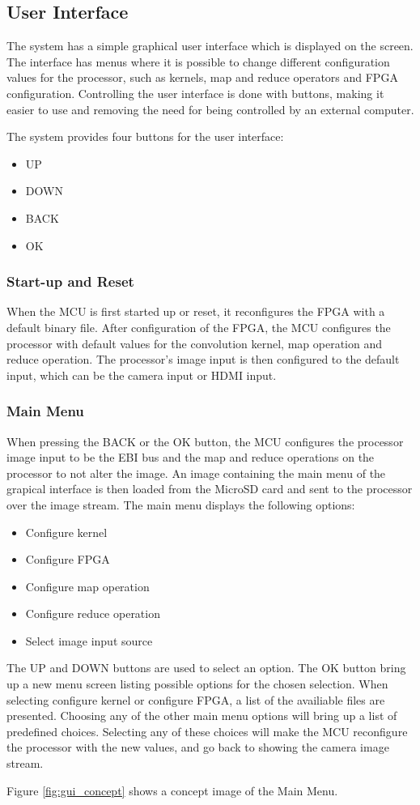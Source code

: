 \subsection{User Interface}
The system has a simple graphical user interface which is displayed on the screen. The interface has menus where it is possible to change different configuration values for the processor, such as kernels, map and reduce operators and FPGA configuration. Controlling the user interface is done with buttons, making it easier to use and removing the need for being controlled by an external computer.

The system provides four buttons for the user interface:
\begin{itemize}
	\item UP
	\item DOWN
	\item BACK
	\item OK
\end{itemize}

\subsubsection{Start-up and Reset}
When the MCU is first started up or reset, it reconfigures the FPGA with a default binary file. After configuration of the FPGA, the MCU configures the processor with default values for the convolution kernel, map operation and reduce operation. The processor's image input is then configured to the default input, which can be the camera input or HDMI input.

\subsubsection{Main Menu}
When pressing the BACK or the OK button, the MCU configures the processor image input to be the EBI bus and the map and reduce operations on the processor to not alter the image. An image containing the main menu of the grapical interface is then loaded from the MicroSD card and sent to the processor over the image stream. The main menu displays the following options:

\begin{itemize}
	\item Configure kernel
	\item Configure FPGA
	\item Configure map operation
	\item Configure reduce operation
	\item Select image input source
\end{itemize}

The UP and DOWN buttons are used to select an option. The OK button bring up a new menu screen listing possible options for the chosen selection. When selecting configure kernel or configure FPGA, a list of the availiable files are presented. Choosing any of the other main menu options will bring up a list of predefined choices. Selecting any of these choices will make the MCU reconfigure the processor with the new values, and go back to showing the camera image stream.

Figure \ref{fig:gui_concept} shows a concept image of the Main Menu.


